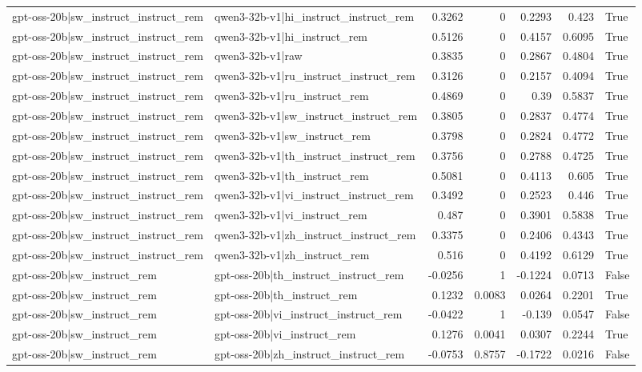 \begin{table}
\begin{tabular}{l l r r r r l}
gpt-oss-20b|sw_instruct_instruct_rem & qwen3-32b-v1|hi_instruct_instruct_rem & 0.3262 & 0 & 0.2293 & 0.423 & True \\
gpt-oss-20b|sw_instruct_instruct_rem & qwen3-32b-v1|hi_instruct_rem & 0.5126 & 0 & 0.4157 & 0.6095 & True \\
gpt-oss-20b|sw_instruct_instruct_rem & qwen3-32b-v1|raw & 0.3835 & 0 & 0.2867 & 0.4804 & True \\
gpt-oss-20b|sw_instruct_instruct_rem & qwen3-32b-v1|ru_instruct_instruct_rem & 0.3126 & 0 & 0.2157 & 0.4094 & True \\
gpt-oss-20b|sw_instruct_instruct_rem & qwen3-32b-v1|ru_instruct_rem & 0.4869 & 0 & 0.39 & 0.5837 & True \\
gpt-oss-20b|sw_instruct_instruct_rem & qwen3-32b-v1|sw_instruct_instruct_rem & 0.3805 & 0 & 0.2837 & 0.4774 & True \\
gpt-oss-20b|sw_instruct_instruct_rem & qwen3-32b-v1|sw_instruct_rem & 0.3798 & 0 & 0.2824 & 0.4772 & True \\
gpt-oss-20b|sw_instruct_instruct_rem & qwen3-32b-v1|th_instruct_instruct_rem & 0.3756 & 0 & 0.2788 & 0.4725 & True \\
gpt-oss-20b|sw_instruct_instruct_rem & qwen3-32b-v1|th_instruct_rem & 0.5081 & 0 & 0.4113 & 0.605 & True \\
gpt-oss-20b|sw_instruct_instruct_rem & qwen3-32b-v1|vi_instruct_instruct_rem & 0.3492 & 0 & 0.2523 & 0.446 & True \\
gpt-oss-20b|sw_instruct_instruct_rem & qwen3-32b-v1|vi_instruct_rem & 0.487 & 0 & 0.3901 & 0.5838 & True \\
gpt-oss-20b|sw_instruct_instruct_rem & qwen3-32b-v1|zh_instruct_instruct_rem & 0.3375 & 0 & 0.2406 & 0.4343 & True \\
gpt-oss-20b|sw_instruct_instruct_rem & qwen3-32b-v1|zh_instruct_rem & 0.516 & 0 & 0.4192 & 0.6129 & True \\
gpt-oss-20b|sw_instruct_rem & gpt-oss-20b|th_instruct_instruct_rem & -0.0256 & 1 & -0.1224 & 0.0713 & False \\
gpt-oss-20b|sw_instruct_rem & gpt-oss-20b|th_instruct_rem & 0.1232 & 0.0083 & 0.0264 & 0.2201 & True \\
gpt-oss-20b|sw_instruct_rem & gpt-oss-20b|vi_instruct_instruct_rem & -0.0422 & 1 & -0.139 & 0.0547 & False \\
gpt-oss-20b|sw_instruct_rem & gpt-oss-20b|vi_instruct_rem & 0.1276 & 0.0041 & 0.0307 & 0.2244 & True \\
gpt-oss-20b|sw_instruct_rem & gpt-oss-20b|zh_instruct_instruct_rem & -0.0753 & 0.8757 & -0.1722 & 0.0216 & False \\

\end{tabular}
\end{table}
